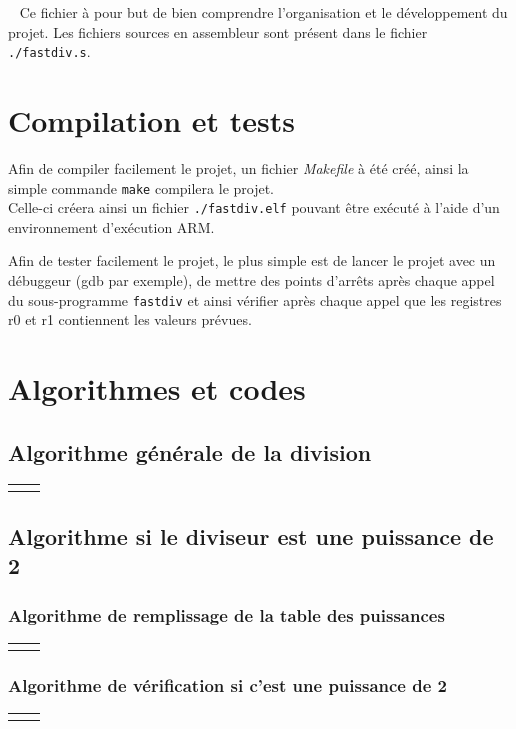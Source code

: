 \documentclass[a4paper, 11pt]{article}
\begin{document}
	\maketitle
	\setcounter{secnumdepth}{3}
	~
	\newline
	Ce fichier à pour but de bien comprendre l'organisation et le développement du projet. Les fichiers sources en assembleur sont présent dans le fichier
	\texttt{./fastdiv.s}.

	\section{Compilation et tests}
		Afin de compiler facilement le projet, un fichier \textit{Makefile} à été créé, ainsi la simple commande \texttt{make} compilera le projet. \\
		Celle-ci créera ainsi un fichier \texttt{./fastdiv.elf} pouvant être exécuté à l'aide d'un environnement d'exécution ARM.

		Afin de tester facilement le projet, le plus simple est de lancer le projet avec un débuggeur (gdb par exemple), de mettre des points d'arrêts après
		chaque appel du sous-programme \texttt{fastdiv} et ainsi vérifier après chaque appel que les registres r0 et r1 contiennent les valeurs prévues.
	\section{Algorithmes et codes}
	\subsection{Algorithme générale de la division}
	\hspace{-50px}
	\begin{tabular}{ll}
		 & \hspace{-40px} 
	\end{tabular}
	\subsection{Algorithme si le diviseur est une puissance de 2}
	\subsubsection{Algorithme de remplissage de la table des puissances}
	\hspace{-50px}
	\begin{tabular}{ll}
		 &  
	\end{tabular}
	\subsubsection{Algorithme de vérification si c'est une puissance de 2}
	\hspace{-50px}
	\begin{tabular}{ll}
		 &  
	\end{tabular}
\end{document}
